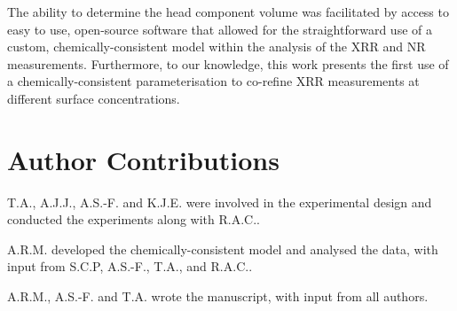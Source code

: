 \documentclass[amsmath,amssymb,twocolumn,superscriptaddress]{revtex4-1}
\begin{document}
The ability to determine the head component volume was facilitated by access to easy to use, open-source software that allowed for the straightforward use of a custom, chemically-consistent model within the analysis of the XRR and NR measurements.
Furthermore, to our knowledge, this work presents the first use of a chemically-consistent parameterisation to co-refine XRR measurements at different surface concentrations.

\section{Author Contributions}
T.A., A.J.J., A.S.-F. and K.J.E. were involved in the experimental design and conducted the experiments along with R.A.C..

A.R.M. developed the chemically-consistent model and analysed the data, with input from S.C.P, A.S.-F., T.A., and R.A.C..

A.R.M., A.S.-F. and T.A. wrote the manuscript, with input from all authors.


\end{document}
